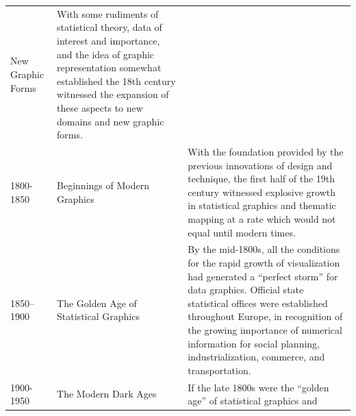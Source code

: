 \documentclass[]{book}
\begin{document}
\begin{longtable}[]{@{}lll@{}}
\begin{minipage}[t]{0.11\columnwidth}
New Graphic Forms\strut
\end{minipage} & \begin{minipage}[t]{0.68\columnwidth}\raggedright\strut
With some rudiments of statistical theory, data of interest and
importance, and the idea of graphic representation somewhat established
the 18th century witnessed the expansion of these aspects to new domains
and new graphic forms.\strut
\end{minipage}\tabularnewline
\begin{minipage}[t]{0.12\columnwidth}\raggedright\strut
1800-1850\strut
\end{minipage} & \begin{minipage}[t]{0.11\columnwidth}\raggedright\strut
Beginnings of Modern Graphics\strut
\end{minipage} & \begin{minipage}[t]{0.68\columnwidth}\raggedright\strut
With the foundation provided by the previous innovations of design and
technique, the first half of the 19th century witnessed explosive growth
in statistical graphics and thematic mapping at a rate which would not
equal until modern times.\strut
\end{minipage}\tabularnewline
\begin{minipage}[t]{0.12\columnwidth}\raggedright\strut
1850--1900\strut
\end{minipage} & \begin{minipage}[t]{0.11\columnwidth}\raggedright\strut
The Golden Age of Statistical Graphics\strut
\end{minipage} & \begin{minipage}[t]{0.68\columnwidth}\raggedright\strut
By the mid-1800s, all the conditions for the rapid growth of
visualization had generated a ``perfect storm'' for data graphics.
Official state statistical offices were established throughout Europe,
in recognition of the growing importance of numerical information for
social planning, industrialization, commerce, and transportation.\strut
\end{minipage}\tabularnewline
\begin{minipage}[t]{0.12\columnwidth}\raggedright\strut
1900-1950\strut
\end{minipage} & \begin{minipage}[t]{0.11\columnwidth}\raggedright\strut
The Modern Dark Ages\strut
\end{minipage} & \begin{minipage}[t]{0.68\columnwidth}\raggedright\strut
If the late 1800s were the ``golden age'' of statistical graphics and

\end{minipage}
\end{longtable}
\end{document}
